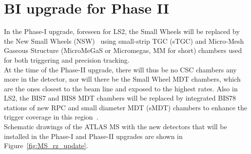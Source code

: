 \section {BI upgrade for Phase II}
In the Phase-I upgrade, foreseen for LS2, the Small Wheels will be replaced by the New Small Wheels (NSW)~\cite{NSW} using small-strip TGC (sTGC) and Micro-Mesh Gaseous Structure
(MicroMeGaS or Micromegas, MM for short) chambers used for both triggering and precision tracking.\\
At the time of the Phase-II upgrade, there will thus be no CSC chambers
any more in the detector, nor will there be the Small Wheel MDT chambers, which are the ones closest to the beam line and exposed to the highest rates. Also in LS2, the BIS7 and
BIS8 MDT chambers will be replaced by integrated BIS78 stations of new RPC and small diameter MDT (sMDT) chambers to enhance the trigger coverage in this region~\cite{BIS78}.\\
Schematic drawings of the ATLAS MS with the new detectors that will be installed in the Phase-I and Phase-II upgrades are shown in Figure~\ref{fig:MS_rz_update}.\\
